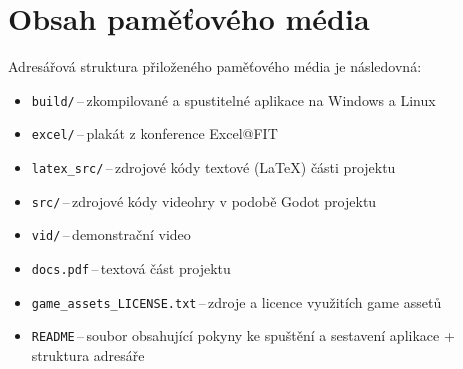 
%






\chapter{Obsah paměťového média}\label{chap:file_directory}
Adresářová struktura přiloženého paměťového média je následovná:
\begin{itemize}
    \item \verb|build/|\,--\,zkompilované a spustitelné aplikace na Windows a Linux
    \item \verb|excel/|\,--\,plakát z konference Excel@FIT
    \item \verb|latex_src/|\,--\,zdrojové kódy textové (\LaTeX) části projektu
    \item \verb|src/|\,--\,zdrojové kódy videohry v podobě Godot projektu
    \item \verb|vid/|\,--\,demonstrační video
    \item \verb|docs.pdf|\,--\,textová část projektu
    \item \verb|game_assets_LICENSE.txt|\,--\,zdroje a licence využitích game assetů
    \item \verb|README|\,--\,soubor obsahující pokyny ke spuštění a sestavení aplikace + struktura adresáře
\end{itemize}

